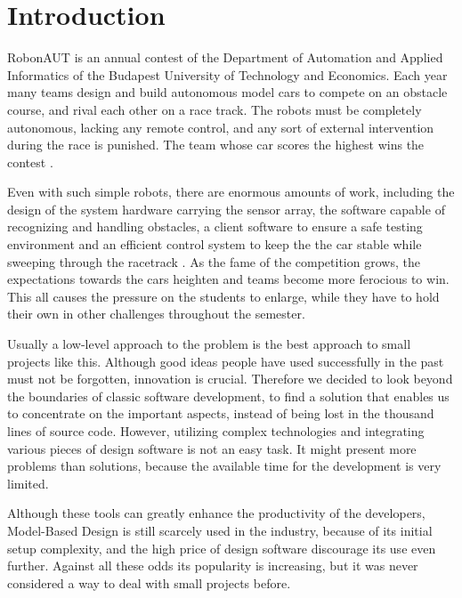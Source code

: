 \section{Introduction}
\label{sec:Introduction}


RobonAUT is an annual contest of the Department of Automation and Applied Informatics of the Budapest University of Technology and Economics. Each year many teams design and build autonomous model cars to compete on an obstacle course, and rival each other on a race track. The robots must be completely autonomous, lacking any remote control, and any sort of external intervention during the race is punished. The team whose car scores the highest wins the contest \cite{rules}.


Even with such simple robots, there are enormous amounts of work, including the design of the system hardware carrying the sensor array, the software capable of recognizing and handling obstacles, a client software to ensure a safe testing environment and an efficient control system to keep the the car stable while sweeping through the racetrack \cite{robonauttdk}. As the fame of the competition grows, the expectations towards the cars heighten and teams become more ferocious to win. This all causes the pressure on the students to enlarge, while they have to hold their own in other challenges throughout the semester.


Usually a low-level approach to the problem is the best approach to small projects like this. Although good ideas people have used successfully in the past must not be forgotten, innovation is crucial. Therefore we decided to look beyond the boundaries of classic software development, to find a solution that enables us to concentrate on the important aspects, instead of being lost in the thousand lines of source code. However, utilizing complex technologies and integrating various pieces of design software is not an easy task. It might present more problems than solutions, because the available time for the development is very limited.


Although these tools can greatly enhance the productivity of the developers, Model-Based Design is still scarcely used in the industry, because of its initial setup complexity, and the high price of design software discourage its use even further. Against all these odds its popularity is increasing, but it was never considered a way to deal with small projects before.

